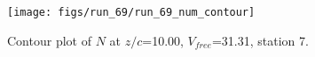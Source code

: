 \begin{figure}[H]
\centering
\texttt{[image: figs/run\_69/run\_69\_num\_contour]}
\caption{Contour plot of $N$ at $z/c$=10.00, $V_{free}$=31.31, station 7.}
\end{figure}


